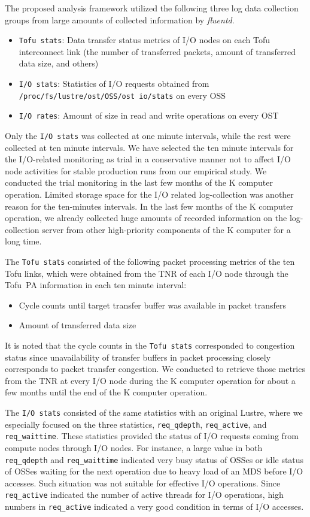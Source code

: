 \documentclass{jhps}
\begin{document}
The proposed analysis framework utilized the following three log data collection groups
from large amounts of collected information by {\itshape fluentd}.
%
\begin{itemize}
\item {\tt Tofu stats}: Data transfer status metrics of I/O nodes on each Tofu interconnect link
(the number of transferred packets, amount of transferred data size, and others)
\item {\tt I/O stats}: Statistics of I/O requests obtained from
{\tt /proc/fs/lustre/ost/OSS/ost io/stats} on every OSS
\item {\tt I/O rates}: Amount of size in read and write operations on every OST
\end{itemize}
%
Only the {\tt I/O stats} was collected at one minute intervals,
while the rest were collected at ten minute intervals.
We have selected the ten minute intervals for the I/O-related monitoring as trial
in a conservative manner not to affect I/O node activities for stable production runs
from our empirical study.
We conducted the trial monitoring in the last few months of the K computer operation.
Limited storage space for the I/O related log-collection was another reason
for the ten-minutes intervals.
In the last few months of the K computer operation,
we already collected huge amounts of recorded information
on the log-collection server from other high-priority components
of the K computer for a long time.

The {\tt Tofu stats} consisted of the following packet processing metrics
of the ten Tofu links, which were obtained from the TNR of each I/O node
through the Tofu~PA information in each ten minute interval:
%
\begin{itemize}
\item Cycle counts until target transfer buffer was available in packet transfers
\item Amount of transferred data size
\end{itemize}
%
It is noted that the cycle counts in the {\tt Tofu stats} corresponded to
congestion status since unavailability of transfer buffers in packet processing
closely corresponds to packet transfer congestion.
We conducted to retrieve those metrics from the TNR at every I/O node
during the K computer operation for about a few months
until the end of the K computer operation.

The {\tt I/O stats} consisted of the same statistics with an original Lustre,
where we especially focused on the three statistics,
{\tt req\_qdepth}, {\tt req\_active}, and {\tt req\_waittime}.
These statistics provided the status of I/O requests coming from compute nodes through I/O nodes.
For instance, a large value in both {\tt req\_qdepth} and {\tt req\_waittime} indicated
very busy status of OSSes or idle status of OSSes waiting for the next operation
due to heavy load of an MDS before I/O accesses.
Such situation was not suitable for effective I/O operations.
Since {\tt req\_active} indicated the number of active threads for I/O operations,
high numbers in {\tt req\_active} indicated a very good condition
in terms of I/O accesses.
\end{document}
